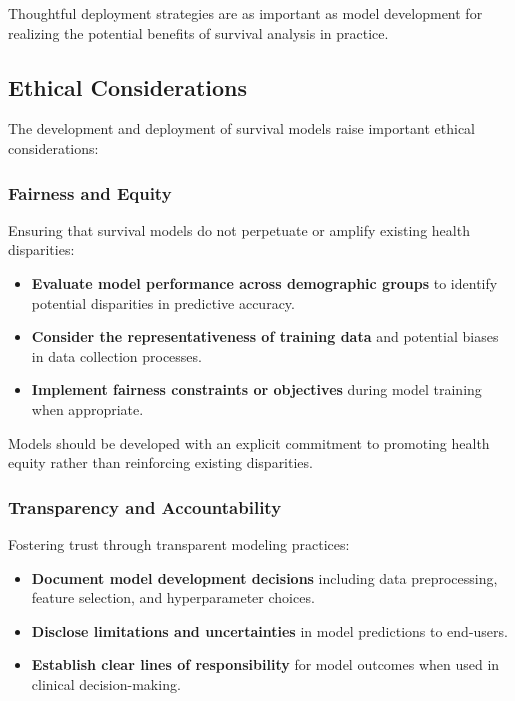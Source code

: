 Thoughtful deployment strategies are as important as model development for realizing the potential benefits of survival analysis in practice.

\subsection{Ethical Considerations}

The development and deployment of survival models raise important ethical considerations:

\subsubsection{Fairness and Equity}

Ensuring that survival models do not perpetuate or amplify existing health disparities:

\begin{itemize}
    \item \textbf{Evaluate model performance across demographic groups} to identify potential disparities in predictive accuracy.
    
    \item \textbf{Consider the representativeness of training data} and potential biases in data collection processes.
    
    \item \textbf{Implement fairness constraints or objectives} during model training when appropriate.
\end{itemize}

Models should be developed with an explicit commitment to promoting health equity rather than reinforcing existing disparities.

\subsubsection{Transparency and Accountability}

Fostering trust through transparent modeling practices:

\begin{itemize}
    \item \textbf{Document model development decisions} including data preprocessing, feature selection, and hyperparameter choices.
    
    \item \textbf{Disclose limitations and uncertainties} in model predictions to end-users.
    
    \item \textbf{Establish clear lines of responsibility} for model outcomes when used in clinical decision-making.
\end{itemize}

